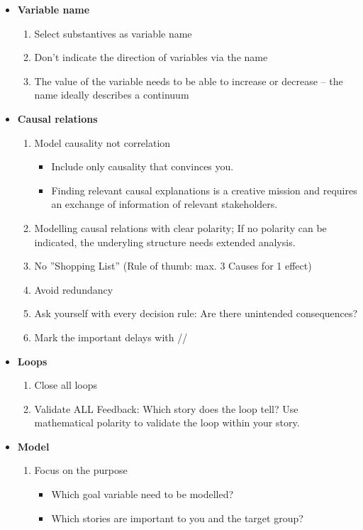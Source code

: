 \begin{itemize}
	\tightlist
	\item \textbf{Variable name}
	\begin{enumerate}
		\item Select substantives as variable name
		\item Don't indicate the direction of variables via the name
		\item The value of the variable needs to be able to increase or decrease
		– the name ideally describes a continuum
	\end{enumerate}
	\item \textbf{Causal relations}
	\begin{enumerate}
		\item Model causality not correlation
		\begin{itemize}
			\item Include only causality that convinces you.
			\item Finding relevant causal explanations is a creative mission and
			requires an exchange of information of relevant stakeholders.
		\end{itemize}
		\item Modelling causal relations with clear polarity; If no polarity
		can be indicated, the underyling structure needs extended analysis.
		\item No ''Shopping List'' (Rule of thumb: max. 3 Causes for 1 effect)
		\item Avoid redundancy
		\item Ask yourself with every decision rule: Are there unintended
		consequences?
		\item Mark the important delays with //
	\end{enumerate}
	\item \textbf{Loops}
	\begin{enumerate}
		\item Close all loops
		\item Validate ALL Feedback: Which story does the loop tell? Use
		mathematical polarity to validate the loop within your story.
	\end{enumerate}
	\item \textbf{Model}
	\begin{enumerate}
		\item Focus on the purpose
		\begin{itemize}
			\item Which goal variable need to be modelled?
			\item Which stories are important to you and the target group?
		\end{itemize}
	\end{enumerate}
\end{itemize}

